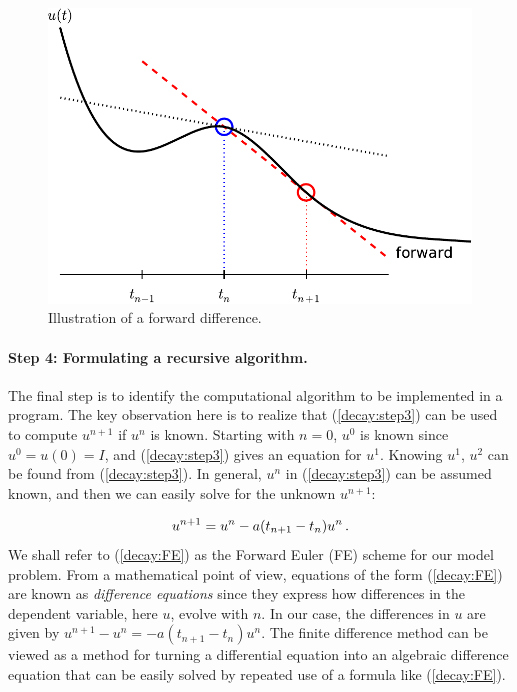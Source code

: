 \documentclass[%
oneside,                 %
final,                   %
10pt]{article}
\begin{document}
\begin{figure}[!ht]  %
  \centerline{\includegraphics[width=0.8\linewidth]{fig-alg/fd_forward.pdf}}
  \caption{
  Illustration of a forward difference. \label{decay:sketch:FE}
  }
\end{figure}



\paragraph{Step 4: Formulating a recursive algorithm.}
The final step is to identify the computational algorithm to be implemented
in a program. The key observation here is to realize that
(\ref{decay:step3}) can be used to compute $u^{n+1}$ if $u^n$ is known.
Starting with $n=0$, $u^0$ is known since $u^0=u(0)=I$, and
(\ref{decay:step3}) gives an equation for $u^1$. Knowing $u^1$,
$u^2$ can be found from (\ref{decay:step3}). In general, $u^n$
in (\ref{decay:step3}) can be assumed known, and then we can easily solve for
the unknown $u^{n+1}$:

\begin{equation}
u^{n+1} = u^n - a(t_{n+1} -t_n)u^n\thinspace .
\label{decay:FE}
\end{equation}
We shall refer to (\ref{decay:FE}) as the Forward Euler (FE) scheme
for our model problem. From a mathematical point of view,
equations of the form (\ref{decay:FE}) are known as
\emph{difference equations} since they express how differences in
the dependent variable, here $u$, evolve with $n$. In our case,
the differences in $u$ are given by $u^{n+1}-u^n = -a(t_{n+1}-t_n)u^n$.
The finite difference method can be viewed as a method for turning
a differential equation into an algebraic difference equation that
can be easily solved by repeated use of a formula like (\ref{decay:FE}).
\end{document}
